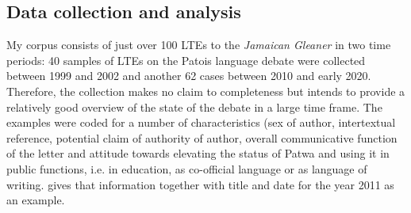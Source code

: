 \documentclass[output=paper,colorlinks,citecolor=brown]{langscibook}
\begin{document}
\subsection{Data collection and analysis}\label{sec:muehleisen:4.1}

My corpus consists of just over 100 LTEs to the \textit{Jamaican Gleaner} in two time periods: 40 samples of LTEs on the Patois language debate were collected between 1999 and 2002 and another 62 cases between 2010 and early 2020. Therefore, the collection makes no claim to completeness but intends to provide a relatively good overview of the state of the debate in a large time frame. The examples were coded for a number of characteristics (sex of author, intertextual reference, potential claim of authority of author, overall communicative function of the letter and attitude towards elevating the status of Patwa and using it in public functions, i.e. in education, as co-official language or as language of writing.  gives that information together with title and date for the year 2011 as an example.
\end{document}
